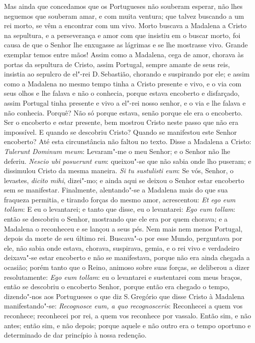Mas ainda que concedamos que os Portugueses não souberam esperar, não
lhes neguemos que souberam amar, e com muita ventura; que talvez
buscando a um rei morto, se vêm a encontrar com um vivo. Morto buscava a
Madalena a Cristo na sepultura, e a perseverança e amor com que insistiu
em o buscar morto, foi causa de que o Senhor lhe enxugasse as lágrimas e
se lhe mostrasse vivo. Grande exemplar temos entre mãos! Assim como a
Madalena, cega de amor, chorava às portas da sepultura de Cristo, assim
Portugal, sempre amante de seus reis, insistia ao sepulcro de el"-rei D.\,Sebastião, chorando e suspirando por ele; e assim como a Madalena no
mesmo tempo tinha a Cristo presente e vivo, e o via com seus olhos e lhe
falava e não o conhecia, porque estava encoberto e disfarçado, assim
Portugal tinha presente e vivo a el"-rei nosso senhor, e o via e lhe
falava e não conhecia. Porquê? Não só porque estava, senão porque ele
era o encoberto. Ser o encoberto e estar presente, bem mostrou Cristo
neste passo que não era impossível. E quando se descobriu Cristo? Quando
se manifestou este Senhor encoberto? Até esta circunstância não faltou
no texto. Disse a Madalena a Cristo: \emph{Tulerunt Dominum meum}:
Levaram"-me o meu Senhor; e o Senhor não lhe deferiu. \emph{Nescio ubi
posuerunt eum}: queixou"-se que não sabia onde lho puseram; e dissimulou
Cristo da mesma maneira. \emph{Si tu sustulisti eum}: Se vós, Senhor, o
levastes, \emph{dicito mihi}, dizei"-mo; e ainda aqui se deixou o Senhor
estar encoberto sem se manifestar. Finalmente, alentando"-se a Madalena
mais do que sua fraqueza permitia, e tirando forças do mesmo amor,
acrescentou: \emph{Et ego eum tollam}: E eu o levantarei; e tanto
que disse, eu o levantarei: \emph{Ego eum tollam}: então se descobriu
o Senhor, mostrando que ele era por quem chorava; e a Madalena o
reconheceu e se lançou a seus pés.
Nem mais nem menos Portugal, depois da morte de seu último rei.
Buscava"-o por esse Mundo, perguntava por ele, não sabia onde estava,
chorava, suspirava, gemia, e o rei vivo e verdadeiro deixava"-se estar
encoberto e não se manifestava,
porque não era ainda chegada a ocasião; porém tanto que o Reino, animoso
sobre suas forças, se deliberou a dizer resolutamente: \emph{Ego eum
tollam}: eu o levantarei e sustentarei com meus braços, então se
descobriu o encoberto Senhor, porque então era chegado o tempo,
dizendo"-nos aos Portugueses o que diz S.\,Gregório que disse Cristo à
Madalena manifestando"-se: \emph{Recognosce eum, a quo recognosceris}:
Reconhecei a quem vos reconhece; reconhecei por rei, a quem vos
reconhece por vassalo. Então sim, e não antes; então sim, e não depois;
porque aquele e não outro era o tempo oportuno e determinado de dar
princípio à nossa redenção.

